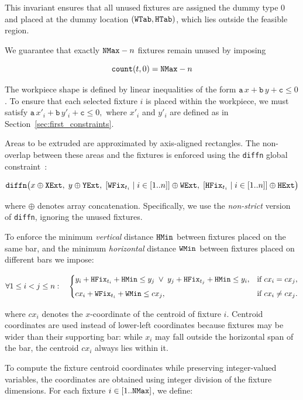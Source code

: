 This invariant ensures that all unused fixtures are assigned the dummy type $0$ and placed at the dummy location $(\mathtt{WTab},\mathtt{HTab})$, which lies outside the feasible region.

We guarantee that exactly $\mathtt{NMax}-n$ fixtures remain unused by imposing

\[
\texttt{count}(t,0) = \mathtt{NMax} - n
\]


The workpiece shape is defined by linear inequalities of the form $ \mathtt{a}\,x + \mathtt{b}\,y + \mathtt{c} \leq 0 $.
To ensure that each selected fixture $ i $ is placed within the workpiece, we must satisfy
$
\mathtt{a}\,x'_i + \mathtt{b}\,y'_i + \mathtt{c} \leq 0,
$
where $x'_i$ and $y'_i$ are defined as in Section~\ref{sec:first_constraints}.

Areas to be extruded are approximated by axis-aligned rectangles. The non-overlap between these areas and the fixtures is enforced using the \texttt{diffn} global constraint~\cite{DBLP:journals/constraints/BeldiceanuCDP07}:

\[
\texttt{diffn}\big(
x \oplus \mathtt{XExt},\;
y \oplus \mathtt{YExt},\;
[\mathtt{WFix}_{t_i} \mid i \in [1..n]] \oplus \mathtt{WExt},\;
[\mathtt{HFix}_{t_i} \mid i \in [1..n]] \oplus \mathtt{HExt}
\big)
\]

\noindent where $ \oplus $ denotes array concatenation. Specifically, we use the \emph{non-strict} version of \texttt{diffn}, ignoring the unused fixtures.

To enforce the minimum \emph{vertical} distance $ \mathtt{HMin} $ between fixtures placed on the same bar, and the minimum \emph{horizontal} distance $ \mathtt{WMin} $ between fixtures placed on different bars we impose:

\begin{equation*}
	\forall 1 \le i < j \le n: \quad
	\begin{cases}
		y_i + \mathtt{HFix}_{t_i} + \mathtt{HMin} \le y_j
		\;\vee\;
		y_j + \mathtt{HFix}_{t_j} + \mathtt{HMin} \le y_i, & \text{if } cx_i = cx_j,\\[1ex]
		cx_i + \mathtt{WFix}_{t_i} + \mathtt{WMin} \le cx_j, & \text{if } cx_i \neq cx_j.
	\end{cases}
\end{equation*}

\noindent where $cx_i$ denotes the $x$-coordinate of the centroid of fixture $ i $. Centroid coordinates are used instead of lower-left coordinates because fixtures may be wider than their supporting bar: while $ x_i $ may fall outside the horizontal span of the bar, the centroid $ cx_i $ always lies within it.

To compute the fixture centroid coordinates while preserving integer-valued variables, the coordinates are obtained using integer division of the fixture dimensions. For each fixture $i \in [1..\mathtt{NMax}]$, we define:

